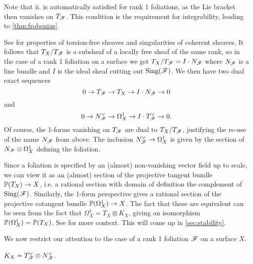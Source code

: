 \begin{remark}
    Note that ii. is automatically satisfied for rank 1 foliations, as the Lie
    bracket then vanishes on $T_\scrF$. This condition is the requirement for
    integrability, leading to \cref{thm:frobenius}.
\end{remark}

See \cite[\S2]{friedman_book} for properties of torsion-free sheaves and
singularities of coherent sheaves. It follows that $T_X/T_\scrF$ is a subsheaf
of a locally free sheaf of the same rank, so in the case of a rank 1 foliation
on a surface we get $T_X/T_\scrF=I\cdot N_\scrF$ where $N_\scrF$ is a line
bundle and $I$ is the ideal sheaf cutting out $\Sing(\scrF)$. We then have two
dual exact sequences
\begin{equation}\label{eqn:tangent sequence}
    0 \to T_\scrF \to T_X \to I\cdot N_\scrF \to 0
\end{equation}
and
\begin{equation}\label{eqn:1-form sequence}
    0 \to N_\scrF^\vee \to \Omega^1_X \to I\cdot T_\scrF^\vee \to 0.
\end{equation}
Of course, the 1-forms vanishing on $T_\scrF$ are dual to $T_X/T_\scrF$,
justifying the re-use of the name $N_\scrF$ from above. The inclusion
$N_\scrF^\vee\to\Omega^1_X$ is given by the section of $N_\scrF\otimes\Omega^1_X$
defining the foliation.

\begin{remark}
    Since a foliation is specified by an (almost) non-vanishing vector field up
    to scale, we can view it as an (almost) section of the projective tangent
    bundle $\P(T_X)\to X$, i.e. a rational section with domain of definition the
    complement of $\Sing(\scrF)$. Similarly, the 1-form perspective gives a
    rational section of the projective cotangent bundle $\P(\Omega^1_X)\to X$.
    The fact that these are equivalent can be seen from the fact that
    $\Omega^1_X=T_X\otimes K_X$, giving an isomorphism $\P(\Omega^1_X)=\P(T_X)$.
    See \cite[\nopp II]{mcquillan_98} for more context. This will come up in
    \cref{sec:stability}.
\end{remark}

We now restrict our attention to the case of a rank 1 foliation $\scrF$ on a
surface $X$.

\begin{proposition}\label{prop:canonical}
    $K_X=T_\scrF^\vee\otimes N_\scrF^\vee$.
\end{proposition}

